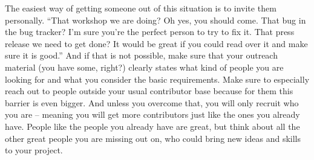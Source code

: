 The easiest way of getting someone out of this situation is to invite them personally. ``That workshop we are doing? Oh yes, you should come. That bug in the bug tracker? I'm sure you're the perfect person to try to fix it. That press release we need to get done? It would be great if you could read over it and make sure it is good.'' And if that is not possible, make sure that your outreach material (you have some, right?) clearly states what kind of people you are looking for and what you consider the basic requirements. Make sure to especially reach out to people outside your usual contributor base because for them this barrier is even bigger. And unless you overcome that, you will only recruit who you are -- meaning you will get more contributors just like the ones you already have. People like the people you already have are great, but think about all the other great people you are missing out on, who could bring new ideas and skills to your project.
